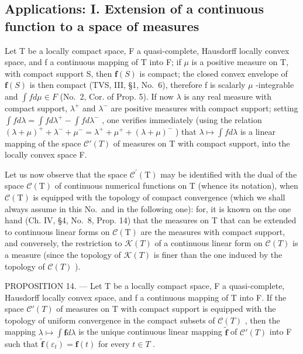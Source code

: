 \subsection{Applications: I. Extension of a continuous function to a space of measures}

Let T be a locally compact space, F a quasi-complete, Hausdorff locally convex space, and f a continuous mapping of T into F; if \(\mu\) is a positive measure on T, with compact support S, then \(\mathbf{f}(S)\) is compact; the closed convex envelope of \(\mathbf{f}(S)\) is then compact (TVS, III, §1, No.~6), therefore f is scalarly \(\mu\) -integrable and \(\int f d\mu \in F\) (No.~2, Cor. of Prop. 5). If now \(\lambda\) is any real measure with compact support, \(\lambda^{+}\) and \(\lambda^{-}\) are positive measures with compact support; setting \(\int f d\lambda = \int f d\lambda^{+} - \int f d\lambda^{-}\) , one verifies immediately (using the relation \((\lambda + \mu)^{+} + \lambda^{-} + \mu^{-} = \lambda^{+} + \mu^{+} + (\lambda + \mu)^{-}\) ) that \(\lambda \mapsto \int f d\lambda\) is a linear mapping of the space \(\mathcal{C}'(T)\) of measures on T with compact support, into the locally convex space F.

Let us now observe that the space \(\mathcal{C}^{\prime}(\mathrm{T})\) may be identified with the dual of the space \(\mathcal{C}(\mathrm{T})\) of continuous numerical functions on T (whence its notation), when \(\mathcal{C}(\mathrm{T})\) is equipped with the topology of compact convergence (which we shall always assume in this No.~and in the following one): for, it is known on the one hand (Ch. IV, §4, No.~8, Prop. 14) that the measures on T that can be extended to continuous linear forms on \(\mathcal{C}(\mathrm{T})\) are the measures with compact support, and conversely, the restriction to \(\mathcal{K}(T)\) of a continuous linear form on \(\mathcal{C}(T)\) is a measure (since the topology of \(\mathcal{K}(T)\) is finer than the one induced by the topology of \(\mathcal{C}(T)\) ).

PROPOSITION 14. --- Let T be a locally compact space, F a quasi-complete, Hausdorff locally convex space, and f a continuous mapping of T into F. If the space \(\mathcal{C}'(T)\) of measures on T with compact support is equipped with the topology of uniform convergence in the compact subsets of \(\mathcal{C}(T)\) , then the mapping \(\lambda \mapsto \int \mathbf{f} d\lambda\) is the unique continuous linear mapping \(\widetilde{\mathbf{f}}\) of \(\mathcal{C}'(T)\) into F such that \(\widetilde{\mathbf{f}}(\varepsilon_t) = \mathbf{f}(t)\) for every \(t \in T\) .

